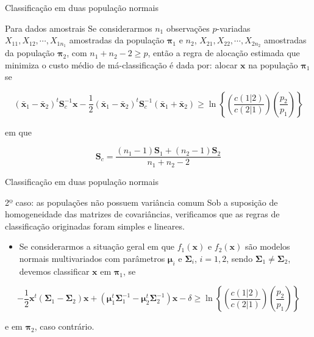 \documentclass[
  ignorenonframetext,
  aspectratio=169,
]{beamer}
\providecommand{\tightlist}{%
  \setlength{\itemsep}{0pt}\setlength{\parskip}{0pt}}
\begin{document}
\begin{frame}{Classificação em duas população normais}
\label{classificauxe7uxe3o-em-duas-populauxe7uxe3o-normais-3}
\begin{block}{Para dados amostrais}
\label{para-dados-amostrais}
Se considerarmos \(n_1\) observações \(p\)-variadas
\(X_{11}, X_{12}, \cdots, X_{1n_1}\) amostradas da população
\(\boldsymbol{\pi}_1\) e \(n_2\), \(X_{21}, X_{22}, \cdots, X_{2n_2}\)
amostradas da população \(\boldsymbol{\pi}_2\), com
\(n_1 + n_2 - 2 \geqslant p\), então a regra de alocação estimada que
minimiza o custo médio de má-classificação é dada por: alocar
\(\boldsymbol{x}\) na população \(\boldsymbol{\pi}_1\) se

\[(\bar{\boldsymbol{x}}_1 - \bar{\boldsymbol{x}}_2)^t \boldsymbol{S}_c^{-1} \boldsymbol{x} - \dfrac{1}{2} (\bar{\boldsymbol{x}}_1 - \bar{\boldsymbol{x}}_2)^t \boldsymbol{S}_c^{-1} (\bar{\boldsymbol{x}}_1 + \bar{\boldsymbol{x}}_2)\geqslant \ln \left\lbrace  \left( \dfrac{c(1|2)}{c(2|1)}\right) \left( \dfrac{p_2}{p_1}\right) \right\rbrace\]

em que

\[\boldsymbol{S}_c =  \displaystyle{\frac{(n_1 - 1) {\boldsymbol{S}_1} + (n_2 - 1) {\boldsymbol{S}_2}}{n_1 + n_2 - 2}}\]
\end{block}
\end{frame}

\begin{frame}{Classificação em duas população normais}
\label{classificauxe7uxe3o-em-duas-populauxe7uxe3o-normais-4}
\begin{block}{2º caso: as populações não possuem variância comum}
\label{uxba-caso-as-populauxe7uxf5es-nuxe3o-possuem-variuxe2ncia-comum}
Sob a suposição de homogeneidade das matrizes de covariâncias,
verificamos que as regras de classificação originadas foram simples e
lineares.

\begin{itemize}
\tightlist
\item
  Se considerarmos a situação geral em que \(f_1(\boldsymbol{x})\) e
  \(f_2(\boldsymbol{x})\) são modelos normais multivariados com
  parâmetros \(\boldsymbol{\mu}_i\) e \(\boldsymbol{\Sigma}_i\),
  \(i = 1,2\), sendo
  \(\boldsymbol{\Sigma}_1 \neq \boldsymbol{\Sigma}_2\), devemos
  classificar \(\boldsymbol{x}\) em \(\boldsymbol{\pi}_1\), se
\end{itemize}

\[-\dfrac{1}{2} \boldsymbol{x}^t \left( \boldsymbol{\Sigma}_1 - \boldsymbol{\Sigma}_2\right) \boldsymbol{x} + \left( \boldsymbol{\mu}_1^t \boldsymbol{\Sigma}_1^{-1} - \boldsymbol{\mu}_2^t \boldsymbol{\Sigma}_2^{-1}\right) \boldsymbol{x} - \delta \geqslant \ln \left\lbrace  \left( \dfrac{c(1|2)}{c(2|1)}\right) \left( \dfrac{p_2}{p_1}\right) \right\rbrace\]

e em \(\boldsymbol{\pi}_2\), caso contrário.
\end{block}
\end{frame}
\end{document}
